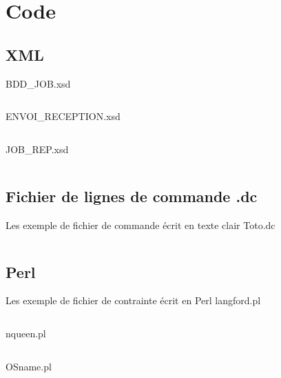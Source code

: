 \documentclass[11pt]{report}
\begin{document}
\newpage
\section{Code}
\subsection{XML} 

BDD\_JOB.xsd
\inputminted[tabsize=2,frame=lines,linenos]{XML}{../Schema_XML/BDD_JOB.xsd}

ENVOI\_RECEPTION.xsd
\inputminted[tabsize=2,frame=lines,linenos]{XML}{../Schema_XML/ENVOI_RECEPTION.xsd}
\newpage
JOB\_REP.xsd
\inputminted[tabsize=2,frame=lines,linenos]{XML}{../Schema_XML/JOB_REP.xsd}
\newpage
\subsection{Fichier de lignes de commande .dc}
Les exemple de fichier de commande écrit en texte clair 
Toto.dc
\inputminted[tabsize=2,frame=lines,linenos]{Perl}{../Echantillon_Script_Cmd/Toto.dc}
\subsection{Perl}
Les exemple de fichier de contrainte écrit en Perl 
langford.pl
\inputminted[tabsize=2,frame=lines,linenos]{Perl}{../Echantillon_Script_Perl/langford.pl}

nqueen.pl
\inputminted[tabsize=2,frame=lines,linenos]{Perl}{../Echantillon_Script_Perl/nqueen.pl}
OSname.pl
\inputminted[tabsize=2,frame=lines,linenos]{Perl}{../Echantillon_Script_Perl/OSname.pl}
\end{document}
